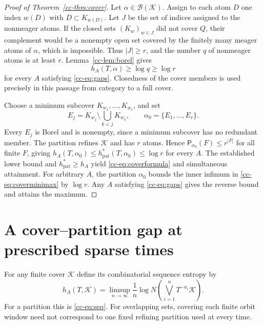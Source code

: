 \documentclass[11pt,reqno]{amsart}
\numberwithin{equation}{section}
\theoremstyle{definition}
\newcommand{\Patt}{\mathsf P}
\newcommand{\hpat}{h_{\mathrm{pat}}^{*}}
\newcommand{\K}{\mathcal K}
\begin{document}
\begin{proof}[Proof of Theorem~\ref{cc-thm:cover}]
Let $\alpha\in\mathcal B(\K)$. Assign to each atom $D$ one index
$w(D)$ with $D\subset K_{w(D)}$. Let $J$ be the set of indices assigned
to the nonmeager atoms. If the closed sets $(K_w)_{w\in J}$ did not
cover $Q$, their complement would be a nonempty open set covered by
the finitely many meager atoms of $\alpha$, which is impossible.
Thus $|J|\ge r$, and the number $q$ of nonmeager atoms is at least $r$.
Lemma~\ref{cc-lem:borel} gives
\[
 h_A(T,\alpha)\ge\log q\ge\log r
\]
for every $A$ satisfying \eqref{cc-eq:gaps}. Closedness of the cover
members is used precisely in this passage from category to a full cover.

Choose a minimum subcover $K_{w_1},\ldots,K_{w_r}$, and set
\begin{equation}\label{cc-eq:ordered}
 E_j=K_{w_j}\setminus\bigcup_{k<j}K_{w_k},\qquad
 \alpha_0=\{E_1,\ldots,E_r\}.
\end{equation}
Every $E_j$ is Borel and is nonempty, since a minimum subcover has no
redundant member. The partition refines $\K$ and has $r$ atoms. Hence
$\Patt_{\alpha_0}(F)\le r^{|F|}$ for all finite $F$, giving
$h_A(T,\alpha_0)\le\hpat(T,\alpha_0)\le\log r$ for every $A$.
The established lower bound and $\hpat\ge h_A$ yield
\eqref{cc-eq:coverformula} and simultaneous attainment.
For arbitrary $A$, the partition $\alpha_0$ bounds the inner infimum
in \eqref{cc-eq:coverminimax} by $\log r$. Any $A$ satisfying
\eqref{cc-eq:gaps} gives the reverse bound and attains the maximum.
\end{proof}

\section{A cover--partition gap at prescribed sparse times}

For any finite cover $\K$ define its combinatorial sequence entropy by
\[
 h_A(T,\K)=\limsup_{n\to\infty}\frac1n
 \log N\left(\bigvee_{i=1}^n T^{-a_i}\K\right).
\]
For a partition this is \eqref{cc-eq:seq}. For overlapping sets, covering
each finite orbit window need not correspond to one fixed refining
partition used at every time.
\end{document}
